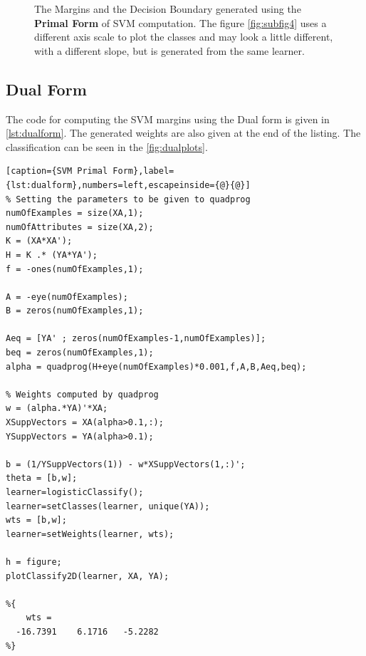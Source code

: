 \documentclass[a4paper, 11pt]{article}
\begin{document}
\begin{figure}
{}
\caption[]{The Margins and the Decision Boundary generated using the \textbf{Primal Form} of SVM computation. The figure \autoref{fig:subfig4} uses a different axis scale to plot the classes and may look a little different, with a different slope, but is generated from the same learner.}
\label{fig:primalplots}
\end{figure}

\subsection*{Dual Form}
The code for computing the SVM margins using the Dual form is given in \autoref{lst:dualform}. The generated weights are also given at the end of the listing. The classification can be seen in the \autoref{fig:dualplots}.

\vspace{-20pt}
\begin{lstlisting}[caption={SVM Primal Form},label={lst:dualform},numbers=left,escapeinside={@}{@}]
% Setting the parameters to be given to quadprog
numOfExamples = size(XA,1);
numOfAttributes = size(XA,2);
K = (XA*XA');
H = K .* (YA*YA');
f = -ones(numOfExamples,1);

A = -eye(numOfExamples);
B = zeros(numOfExamples,1);

Aeq = [YA' ; zeros(numOfExamples-1,numOfExamples)];
beq = zeros(numOfExamples,1);
alpha = quadprog(H+eye(numOfExamples)*0.001,f,A,B,Aeq,beq);

% Weights computed by quadprog
w = (alpha.*YA)'*XA;
XSuppVectors = XA(alpha>0.1,:);
YSuppVectors = YA(alpha>0.1);

b = (1/YSuppVectors(1)) - w*XSuppVectors(1,:)';
theta = [b,w];
learner=logisticClassify(); 
learner=setClasses(learner, unique(YA)); 
wts = [b,w];
learner=setWeights(learner, wts); 

h = figure;
plotClassify2D(learner, XA, YA);

%{
    wts =
  -16.7391    6.1716   -5.2282
%}

\end{lstlisting}
\end{document}
